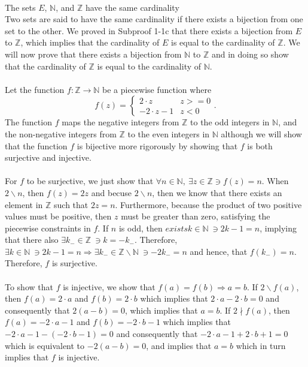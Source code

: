\documentclass{article}
\begin{document}
\\[0.1in]  The sets $E$, $\mathbb{N}$, and $\mathbb{Z}$ have the same cardinality
\\[0.05in]  Two sets are said to have the same cardinality if there exists a bijection from one set to the other. We proved in Subproof 1-1c that there exists a bijection from $E$ to $\mathbb{Z}$, which implies that the cardinality of $E$ is equal to the cardinality of $\mathbb{Z}$.  We will now prove that there exists a bijection from $\mathbb{N}$ to $\mathbb{Z}$ and in doing so show that the cardinality of $\mathbb{Z}$ is equal to the cardinality of $\mathbb{N}$.
\\ \\
Let the function $f: \mathbb{Z} \rightarrow \mathbb{N}$ be a piecewise function where
\begin{equation*}
f(z) = 
\begin{cases}
2\cdot z & z >= 0 \\
-2\cdot z - 1 & z < 0 
\end{cases}.
\end{equation*}
The function $f$ maps the negative integers from $\mathbb{Z}$ to the odd integers in $\mathbb{N}$, and the non-negative integers from $\mathbb{Z}$ to the even integers in $\mathbb{N}$ although we will show that the function $f$ is bijective more rigorously by showing that $f$ is both surjective and injective.
\\ \\
For $f$ to be surjective, we just show that $\forall n \in \mathbb{N}, \ \exists z \in \mathbb{Z} \ni f(z) = n$. When $2\backslash n$, then $f(z) = 2z$ and becuse $2\backslash n$, then we know that there exists an element in $\mathbb{Z}$ such that $2z = n$. Furthermore, because the product of two positive values must be positive, then $z$ must be greater than zero, satisfying the piecewise constraints in $f$. If $n$ is odd, then $exists k \in \mathbb{N} \ \ni 2k - 1 = n$, implying that there also $ \exists k_{-} \in \mathbb{Z} \ \ni k = -k_{-}$. Therefore, $\exists k \in \mathbb{N} \ \ni 2k - 1 =n \Rightarrow \exists k_{-} \in \mathbb{Z} \backslash \mathbb{N} \ \ni -2k_{-} = n$ and hence, that $f(k_{-}) = n$. Therefore, $f$ is surjective.
\\ \\
To show that $f$ is injective, we show that $f(a) = f(b) \Rightarrow a = b$. If $2\backslash f(a)$, then $f(a) = 2\cdot a$ and $f(b) = 2\cdot b$ which implies that $2\cdot a - 2\cdot b = 0$ and consequently that $2(a - b) = 0$, which implies that $a = b$. If $2\nmid f(a)$, then $f(a) = -2\cdot a - 1$ and $f(b) = -2\cdot b - 1$ which implies that $-2\cdot a - 1 - (-2\cdot b - 1) = 0$ and consequently that $-2\cdot a - 1 + 2\cdot b + 1 = 0$ which is equivalent to $-2(a - b) = 0$, and implies that $a = b$ which in turn implies that $f$ is injective.
\end{document}
